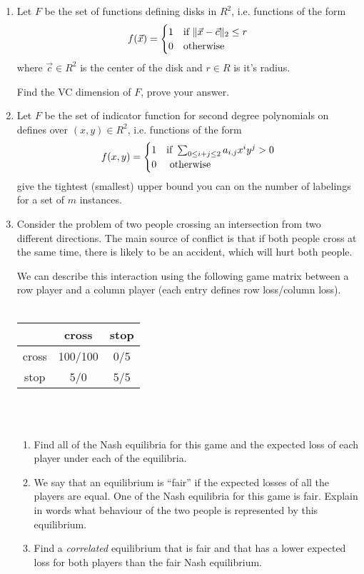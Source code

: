 \documentclass{article}[12pt]
\begin{document}
\begin{enumerate}

\item Let $F$ be the set of functions defining disks in $R^2$,
  i.e. functions of the form 
\[
f(\vec{x}) = \begin{cases}
1 & \mbox{if } \|\vec{x}-\vec{c}\|_2 \leq r \cr
0 & \mbox{otherwise}
\end{cases}
\]
where $\vec{c} \in R^2$ is the center of the disk and $r\in R$ is it's
radius.

Find the VC dimension of $F$, prove your answer.

\pagebreak

\item
Let $F$ be the set of indicator function for second degree polynomials
on defines over $(x,y) \in R^2$, i.e. functions of the form
\[
f(x,y) = \begin{cases}
1 & \mbox{if } \sum_{0 \leq i+j \leq 2} a_{i,j} x^i y^j > 0 \cr
0 & \mbox{ otherwise}
\end{cases}
\]
give the tightest (smallest) upper bound you can on the number of
labelings for a set of $m$ instances.

\pagebreak

\item 

  Consider the problem of two people crossing an intersection from two
  different directions. The main source of conflict is that if both
  people cross at the same time, there is likely to be an accident,
  which will hurt both people.

  We can describe this interaction using the following game matrix
  between a row player and a column player (each entry defines row
  loss/column loss).
~\\
~\\
\begin{center}
\begin{tabular} {| c | c | c |}
\hline
 & cross & stop \\
\hline
cross & 100/100 & 0/5 \\
\hline
stop & 5/0 & 5/5 \\
\hline
\end{tabular}
\end{center}
~\\
~\\
\begin{enumerate}
\item
Find all of the Nash equilibria for this game and the expected loss of
each player under each of the equilibria.
\item
We say that an equilibrium is ``fair'' if the expected losses of all
the players are equal. One of the Nash equilibria for this game is
fair. Explain in words what behaviour of the two people is represented
by this equilibrium.
\item Find a {\em correlated} equilibrium that is fair and that has a
  lower expected loss for both players than the fair Nash equilibrium.
\end{enumerate}


\end{enumerate}
\end{document}
